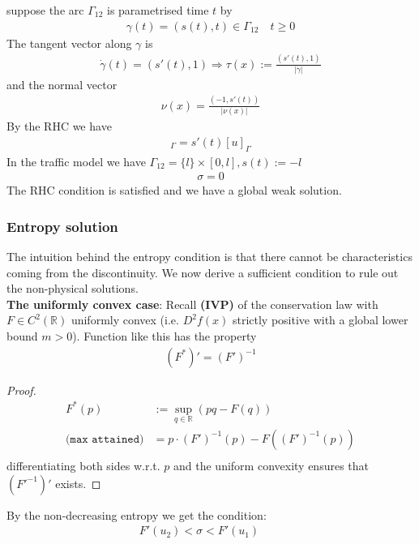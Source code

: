 \begin{example}
suppose the arc $\Gamma_{12}$ is parametrised time $t$ by 
\begin{align*}
	\gamma(t) = (s(t), t) \in \Gamma_{12} \quad t \ge 0
\end{align*}
The tangent vector along $\gamma$ is
\begin{align*}
	\dot{\gamma}(t) = (s'(t), 1) \Rightarrow 
	\tau(x):= \frac{(s'(t), 1)}{|\dot{\gamma}|}
\end{align*}
and the normal vector
\begin{align*}
	\nu(x) = \frac{(-1, s'(t))}{|\nu(x)|}
\end{align*}
By the RHC we have
\begin{align*}
	[F(u)]_\Gamma = s'(t) [u]_\Gamma
\end{align*}
In the traffic model we have $\Gamma_{12} = \{l\} \times [0, l], s(t) := -l$
\begin{align*}
	\sigma = 0
\end{align*}
The RHC condition is satisfied and we have a global weak solution. 
\end{example}


\subsubsection*{Entropy solution}
The intuition behind the entropy condition is that there cannot be characteristics coming from the discontinuity. We now derive a sufficient condition to rule out the non-physical solutions.
\quad\\
\textbf{The uniformly convex case}: Recall \textbf{(IVP)} of the conservation law with $F \in C^2(\mathbb{R})$ uniformly convex (i.e. $D^2f(x)$ strictly positive with a global lower bound $m > 0$). Function like this has the property
\begin{align*}
	(F^*)' = (F')^{-1}
\end{align*}
\begin{proof}
\begin{align*}
	F^*(p)&:= \sup_{q \in \mathbb{R}}(p q - F(q))\\
	\texttt{(max attained)}
	&= p \cdot (F')^{-1}(p) - F((F')^{-1}(p))\\
\end{align*}
differentiating both sides w.r.t. $p$ and the uniform convexity ensures that $(F'^{-1})'$ exists. 
\end{proof}

By the non-decreasing entropy we get the condition:
\begin{align*}
	F'(u_2) < \sigma < F'(u_1) \qquad 
\end{align*}

